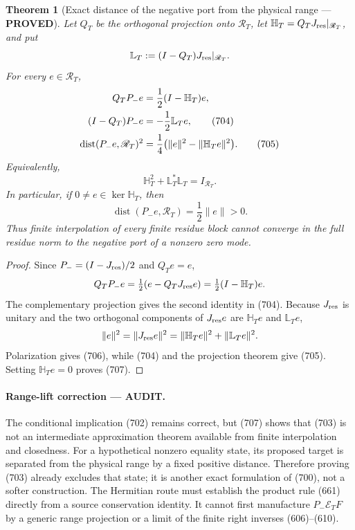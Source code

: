 \documentclass[11pt]{article}
\newtheorem{theorem}{Theorem}
\newcommand{\PROVED}{\textcolor{green!45!black}{\textbf{PROVED}}}
\newcommand{\AUDIT}{\textcolor{orange!75!black}{\textbf{AUDIT}}}
\begin{document}
\begin{theorem}[Exact distance of the negative port from the physical
range --- \PROVED]
Let \(Q_T\) be the orthogonal projection onto \(\mathscr R_T\), let
\(\mathbb H_T=Q_TJ_{\rm res}|_{\mathscr R_T}\), and put
\[
 \mathbb L_T:=(I-Q_T)J_{\rm res}|_{\mathscr R_T}.
\]
For every \(e\in\mathscr R_T\),
\begin{align}
 Q_TP_-e&=\frac12(I-\mathbb H_T)e,\notag\\
 (I-Q_T)P_-e&=-\frac12\mathbb L_Te,                  \tag{704}\\
 \operatorname{dist}(P_-e,\mathscr R_T)^2
 &=\frac14\bigl(\|e\|^2-\|\mathbb H_Te\|^2\bigr).
                                                               \tag{705}
\end{align}
Equivalently,
\begin{equation}
 \boxed{\mathbb H_T^2+\mathbb L_T^*\mathbb L_T=I_{\mathscr R_T}.}
                                                               \tag{706}
\end{equation}
In particular, if \(0\ne e\in\ker\mathbb H_T\), then
\begin{equation}
 \operatorname{dist}(P_-e,\mathscr R_T)=\frac12\|e\|>0.        \tag{707}
\end{equation}
Thus finite interpolation of every finite residue block cannot converge in
the full residue norm to the negative port of a nonzero zero mode.
\end{theorem}

\begin{proof}
Since \(P_-=(I-J_{\rm res})/2\) and \(Q_Te=e\),
\[
 Q_TP_-e=\tfrac12(e-Q_TJ_{\rm res}e)
         =\tfrac12(I-\mathbb H_T)e.
\]
The complementary projection gives the second identity in (704).
Because \(J_{\rm res}\) is unitary and the two orthogonal components of
\(J_{\rm res}e\) are \(\mathbb H_Te\) and \(\mathbb L_Te\),
\[
 \|e\|^2=\|J_{\rm res}e\|^2
        =\|\mathbb H_Te\|^2+\|\mathbb L_Te\|^2.
\]
Polarization gives (706), while (704) and the projection theorem give
(705).  Setting \(\mathbb H_Te=0\) proves (707).
\end{proof}

\paragraph{Range-lift correction --- \AUDIT.}
The conditional implication (702) remains correct, but (707) shows that
(703) is not an intermediate approximation theorem available from finite
interpolation and closedness.  For a hypothetical nonzero equality state,
its proposed target is separated from the physical range by a fixed
positive distance.  Therefore proving (703) already excludes that state;
it is another exact formulation of (700), not a softer construction.
The Hermitian route must establish the product rule (661) directly from a
source conservation identity.  It cannot first manufacture
\(P_-\mathcal E_TF\) by a generic range projection or a limit of the finite
right inverses (606)--(610).
\end{document}
